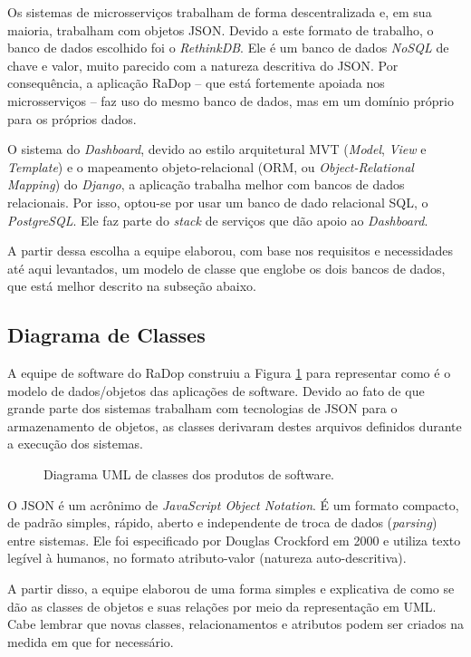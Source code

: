 Os sistemas de microsserviços trabalham de forma descentralizada e, em sua maioria, trabalham com objetos JSON. Devido a este formato de trabalho, o banco de dados escolhido foi o \textit{RethinkDB}. Ele é um banco de dados \textit{NoSQL} de chave e valor, muito parecido com a natureza descritiva do JSON. Por consequência, a aplicação RaDop -- que está fortemente apoiada nos microsserviços -- faz uso do mesmo banco de dados, mas em um domínio próprio para os próprios dados.

O sistema do \textit{Dashboard}, devido ao estilo arquitetural MVT (\textit{Model}, \textit{View} e \textit{Template}) e o mapeamento objeto-relacional (ORM, ou \textit{Object-Relational Mapping}) do \textit{Django}, a aplicação trabalha melhor com bancos de dados relacionais. Por isso, optou-se por usar um banco de dado relacional SQL, o \textit{PostgreSQL}. Ele faz parte do \textit{stack} de serviços que dão apoio ao \textit{Dashboard}.

A partir dessa escolha a equipe elaborou, com base nos requisitos e necessidades até aqui levantados, um modelo de classe que englobe os dois bancos de dados, que está melhor descrito na subseção abaixo.

\subsection{Diagrama de Classes}

A equipe de software do RaDop construiu a Figura \ref{fig:diagrama-classe-soft} para representar como é o modelo de dados/objetos das aplicações de software. Devido ao fato de que grande parte dos sistemas trabalham com tecnologias de JSON para o armazenamento de objetos, as classes derivaram destes arquivos definidos durante a execução dos sistemas.

\begin{figure}[H]
	\caption{\label{fig:diagrama-classe-soft} Diagrama UML de classes dos produtos de software.}
\end{figure}


O JSON é um acrônimo de \textit{JavaScript Object Notation}. É um formato compacto, de padrão simples, rápido, aberto e independente de troca de dados (\textit{parsing}) entre sistemas. Ele foi especificado por Douglas Crockford em 2000 e utiliza texto legível à humanos, no formato atributo-valor (natureza auto-descritiva)\cite{jsonorg}.

A partir disso, a equipe elaborou de uma forma simples e explicativa de como se dão as classes de objetos e suas relações por meio da representação em UML. Cabe lembrar que novas classes, relacionamentos e atributos podem ser criados na medida em que for necessário.

